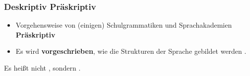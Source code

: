 
\begin{frame}
	\frametitle{Deskriptiv \vs Präskriptiv}
	
\begin{itemize}
	\item Vorgehensweise von (einigen) Schulgrammatiken und Sprachakademien \ras \textbf{Präskriptiv}

	\item Es wird \textbf{vorgeschrieben}, wie die Strukturen der Sprache gebildet werden .
	\end{itemize}	
		
	\ea Es heißt nicht , sondern .	
	\z
	


\end{frame}


